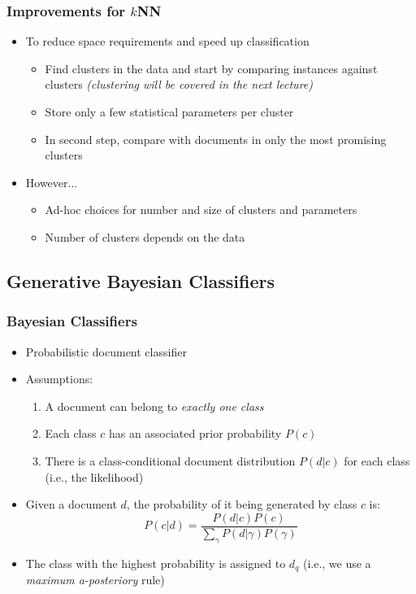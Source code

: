 \documentclass{beamer}
\begin{document}
\begin{frame}
  \frametitle{Improvements for $k$NN}

  \begin{itemize}
  \item To reduce space requirements and speed up classification
    \begin{itemize}
    \item Find clusters in the data and start by comparing instances against clusters \emph{(clustering will be covered in the next lecture)}
    \item Store only a few statistical parameters per cluster
    \item In second step, compare with documents in only the most promising clusters
    \end{itemize}
  \item However...
    \begin{itemize}
    \item Ad-hoc choices for number and size of clusters and parameters
    \item Number of clusters depends on the data
    \end{itemize}
  \end{itemize}

\end{frame}


\subsection{Generative Bayesian Classifiers}

\begin{frame} \frametitle{Bayesian Classifiers}
  
  \begin{itemize}
  \item Probabilistic document classifier
  \item Assumptions:
    \begin{enumerate}
    \item A document can belong to \emph{exactly one class}
    \item Each class $c$ has an associated prior probability $P(c)$
    \item There is a class-conditional document distribution $P(d|c)$ for each
      class (i.e., the likelihood)
    \end{enumerate}
  \item Given a document $d$, the probability of it being generated by class
    $c$ is:
    \begin{displaymath}
      P(c|d) = \frac{P(d|c)P(c)}{\sum_{\gamma}P(d|\gamma)P(\gamma)}
    \end{displaymath}
  \item The class with the highest probability is assigned to $d_q$ (i.e., we use a {\it maximum a-posteriory} rule)
  \end{itemize}

\end{frame}
\end{document}
